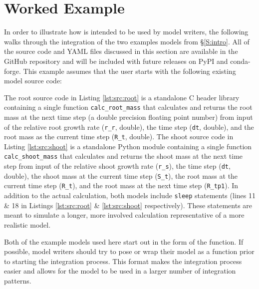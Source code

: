 \documentclass[journal]{IEEEtran}
\newcommand{\todo}[1]{{\color{red}{#1}}}
\newcommand{\pkg}{{\tt \todo{cis\_interface}}{}}
\newcommand{\rootsrc}{}
\newcommand{\shootsrc}{}
\begin{document}
\section{Worked Example}\label{S:example}
%
In order to illustrate how {\pkg} is intended to be used by model writers, the following walks through the integration of the two examples models from \S\ref{S:intro}. All of the source code and YAML files discussed in this section are available in the {\pkg} GitHub repository and will be included with future releases on PyPI and conda-forge. This example assumes that the user starts with the following existing model source code:
%
\rootsrc
%
\shootsrc
%
The root source code in Listing \ref{lst:src:root} is a standalone C header library containing a single function {\tt calc\_root\_mass} that calculates and returns the root mass at the next time step (a double precision floating point number) from input of the relative root growth rate ({\tt r\_r}, double), the time step ({\tt dt}, double), and the root mass as the current time step ({\tt R\_t}, double).
%
The shoot source code in Listing \ref{lst:src:shoot} is a standalone Python module containing a single function {\tt calc\_shoot\_mass} that calculates and returns the shoot mass at the next time step from input of the relative shoot growth rate ({\tt r\_s}), the time step ({\tt dt}, double), the shoot mass at the current time step ({\tt S\_t}), the root mass at the current time step ({\tt R\_t}), and the root mass at the next time step ({\tt R\_tp1}).
%
In addition to the actual calculation, both models include {\tt sleep} statements (lines 11 \& 18 in Listings \ref{lst:src:root} \& \ref{lst:src:shoot} respectively). These statements are meant to simulate a longer, more involved calculation representative of a more realistic model.

Both of the example models used here start out in the form of the function. If possible, model writers should try to pose or wrap their model as a function prior to starting the integration process. This format makes the integration process easier and allows for the model to be used in a larger number of integration patterns.

\end{document}
